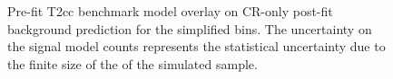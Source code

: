 \begin{figure}[!h]
    \centering
    \caption{
        Pre-fit T2cc benchmark model overlay on CR-only post-fit
        background prediction for the simplified bins. The uncertainty on
        the signal model counts represents the statistical uncertainty due
        to the finite size of the of the simulated sample.
    }
    \label{fig:T2cc_MR_simp}
\end{figure}
